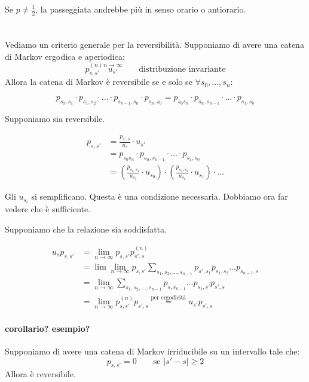 \documentclass[a4paper,12pt]{book}
\begin{document}
Se $ p \ne \frac{1}{2} $, la passeggiata andrebbe più in senso orario o antiorario.
\\
\\
\\
Vediamo un criterio generale per la reversibilità. Supponiamo di avere una catena di Markov ergodica e aperiodica:
$$ p_{s,s'}^(n) \overset{n \to \infty}{u_{s'}} \qquad \text{distribuzione invariante} $$
Allora la catena di Markov è reversibile se e solo se $ \forall s_0, ..., s_n $:

$$ p_{s_0,s_1} \cdot p_{s_1, s_2} \cdot ... \cdot p_{s_{n-1}, s_n} \cdot p_{s_n , s_0} = p_{s_0 s_n} \cdot p_{s_n, s_{n-1}} \cdot ... \cdot p_{s_1, s_0} $$

Supponiamo sia reversibile.

\begin{align*}
	p_{s,s'} & = \frac{p_{s',s}}{u_s}\cdot u_{s'} \\
	& = p_{s_0 s_n} \cdot p_{s_n, s_{n-1}} \cdot ... \cdot p_{s_1, s_0} \\
	& = \left(\frac{p_{s_0, s_1}}{u_{s_1}}\cdot u_{s_0}\right) \cdot \left(\frac{p_{s_1, s_2}}{u_{s_2}}\cdot u_{s_1}\right) \cdot ...
\end{align*}

Gli $ u_{s_i} $ si semplificano. Questa è una condizione necessaria. Dobbiamo ora far vedere che è sufficiente. 

Supponiamo che la relazione sia soddisfatta.

\begin{align*}
	u_s p_{s,s'} & = \lim\limits_{n \to \infty} p_{s,s'}p_{s',s}^{(n)} \\
	& = \lim\lim\limits_{n \to \infty} p_{s,s'} \sum_{s_1, s_2, ..., s_{n-1}} p_{s',s_1} p_{s_1, s_2} ... p_{s_{n-1}, s} \\
	& = \lim\limits_{n \to \infty} \sum_{s_1, s_2, ..., s_{n-1}} p_{s,s_{n-1}} ... p_{s_1, s'}p_{s',s} \\
	& = \lim\limits_{n \to \infty} p_{s,s'}^{(n)} p_{s',s} \overset{\text{per ergodicità}}{=} u_{s'} p_{s',s}
\end{align*}

\paragraph{corollario? esempio?} %
Supponiamo di avere una catena di Markov irriducibile su un intervallo tale che:
$$ p_{s,s'} = 0 \qquad \text{se } | s' - s | \ge 2 $$
Allora è reversibile. 
\end{document}
